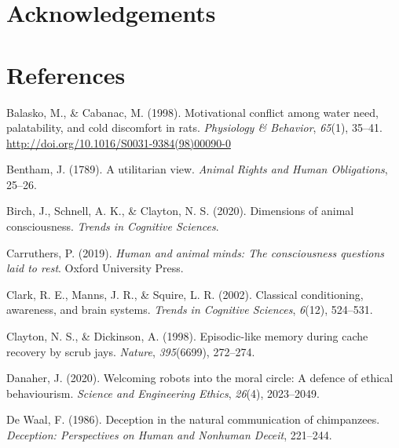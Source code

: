 \documentclass[10pt, letterpaper]{article}
\begin{document}
\hypertarget{acknowledgements}{%
\section{Acknowledgements}\label{acknowledgements}}

\hypertarget{references}{%
\section{References}\label{references}}

\setlength{\parindent}{-0.1in} 
\setlength{\leftskip}{0.125in}

\noindent

\hypertarget{refs}{}
\leavevmode\hypertarget{ref-balasko_motivational_1998}{}%
Balasko, M., \& Cabanac, M. (1998). Motivational conflict among water
need, palatability, and cold discomfort in rats. \emph{Physiology \&
Behavior}, \emph{65}(1), 35--41.
\url{http://doi.org/10.1016/S0031-9384(98)00090-0}

\leavevmode\hypertarget{ref-bentham1789utilitarian}{}%
Bentham, J. (1789). A utilitarian view. \emph{Animal Rights and Human
Obligations}, 25--26.

\leavevmode\hypertarget{ref-birch2020dimensions}{}%
Birch, J., Schnell, A. K., \& Clayton, N. S. (2020). Dimensions of
animal consciousness. \emph{Trends in Cognitive Sciences}.

\leavevmode\hypertarget{ref-carruthers2019human}{}%
Carruthers, P. (2019). \emph{Human and animal minds: The consciousness
questions laid to rest}. Oxford University Press.

\leavevmode\hypertarget{ref-clark2002classical}{}%
Clark, R. E., Manns, J. R., \& Squire, L. R. (2002). Classical
conditioning, awareness, and brain systems. \emph{Trends in Cognitive
Sciences}, \emph{6}(12), 524--531.

\leavevmode\hypertarget{ref-clayton1998episodic}{}%
Clayton, N. S., \& Dickinson, A. (1998). Episodic-like memory during
cache recovery by scrub jays. \emph{Nature}, \emph{395}(6699), 272--274.

\leavevmode\hypertarget{ref-danaher2020welcoming}{}%
Danaher, J. (2020). Welcoming robots into the moral circle: A defence of
ethical behaviourism. \emph{Science and Engineering Ethics},
\emph{26}(4), 2023--2049.

\leavevmode\hypertarget{ref-de1986deception}{}%
De Waal, F. (1986). Deception in the natural communication of
chimpanzees. \emph{Deception: Perspectives on Human and Nonhuman
Deceit}, 221--244.
\end{document}
